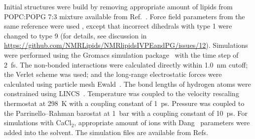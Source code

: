\documentclass[journal=jpcbfk]{achemso}
\begin{document}
Initial structures were build by removing appropriate amount of lipids from POPC:POPG 7:3 mixture available from Ref.~.
Force field parameters from the same reference were used ,
except that incorrect dihedrals with type 1 were changed to type 9
(for details, see discussion in \url{https://github.com/NMRLipids/NMRlipidsIVPEandPG/issues/12}).
Simulations were performed using the Gromacs simulation package~\cite{pall20} with the time step of 2~fs. 
The non-bonded interactions were calculated directly within 1.0~nm cutoff; the Verlet scheme was used\cite{Pall13};
and the long-range electrostatic forces were calculated using particle mesh Ewald~\cite{essman95}. 
The bond lengths of hydrogen atoms were constrained using LINCS~\cite{hess97}.
Temperature was coupled to the velocity rescaling thermostat \cite{bussi07} at 298~K with a coupling constant of 1~ps.
Pressure was coupled to the Parrinello--Rahman barostat \cite{parrinello81} at 1~bar with a coupling constant of 10~ps. 
For simulations with CaCl$_2$, appropriate amount of ions with Dang~\cite{smith94,dang06} parameters were added into the solvent.
The simulation files are available from
Refs.~
\end{document}
